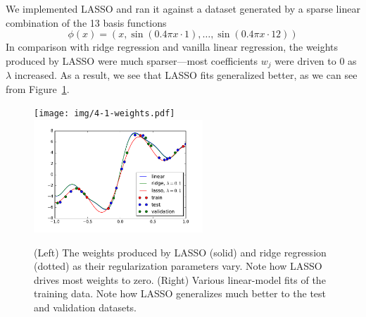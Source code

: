 \documentclass{article}
\begin{document}
\begin{multicols}{2}
We implemented LASSO and ran it against a dataset generated by a sparse linear combination of the 13 basis functions
\begin{equation}
\phi(x)=(x, \sin{(0.4\pi x\cdot1)},\dots,\sin({0.4\pi x\cdot 12}))
\end{equation}
In comparison with ridge regression and vanilla linear regression, the weights produced by LASSO were much sparser---most coefficients $w_j$ were driven to 0 as $\lambda$ increased. As a result, we see that LASSO fits generalized better, as we can see from Figure~\ref{fig:lasso-weights}.

\begin{figure}
   \centering
   \texttt{[image: img/4-1-weights.pdf]}
   \includegraphics[width=2.5in]{img/4-1-fits.pdf}
   \caption{(Left) The weights produced by LASSO (solid) and ridge regression (dotted) as their regularization parameters vary. Note how LASSO drives most weights to zero. (Right) Various linear-model fits of the training data. Note how LASSO generalizes much better to the test and validation datasets.}
   \label{fig:lasso-weights}
\end{figure}




\end{multicols}
\end{document}
